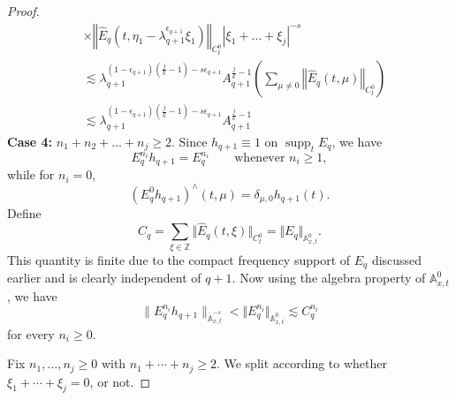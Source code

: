 \documentclass[12pt,reqno,letterpaper]{amsart}
\numberwithin{equation}{section}
\newcommand{\1}{{\bf 1}}
\newcommand{\2}{{\bf 2}}
\newcommand{\A}{\mathbb A}
\newcommand{\Z}{\mathbb Z}
\theoremstyle{remark}
\theoremstyle{remark}
\begin{document}
\begin{proof}
\begin{equation}
\begin{split}
           &\times \left\Vert \hat{E}_q(t,\eta_1 - \lambda_{q+1}^{\epsilon_{q+1}} \xi_1) \right\Vert_{C_t^0} |\xi_1 + \ldots + \xi_j|^{-s}\\
           &\lesssim \lambda_{q+1}^{(1-\epsilon_{q+1})\left(\frac{j}{k}-1\right) - s\epsilon_{q+1}} A_{q+1}^{\frac{j}{k}-1} \left(\sum_{\mu \not=0} \left\Vert \hat{E}_q(t,\mu) \right\Vert_{C_t^0}\right)\\
           &\lesssim \lambda_{q+1}^{(1-\epsilon_{q+1})\left(\frac{j}{k}-1\right) - s\epsilon_{q+1}} A_{q+1}^{\frac{j}{k}-1}
        \end{split}
    \end{equation}
    \textbf{Case 4:} $n_1 + n_2 + \ldots + n_j \geq 2$.
    Since $h_{q+1}\equiv 1$ on $\operatorname{supp}_t E_q$, we have
\[
    E_q^{n_i}h_{q+1}=E_q^{n_i}
    \qquad \text{whenever } n_i\geq 1,
\]
while for $n_i=0$,
\[
    \left(E_q^0h_{q+1}\right)^\wedge(t,\mu)
    =
    \delta_{\mu,0}h_{q+1}(t).
\]
Define
$$
C_q = \sum_{\xi \in \Z} \Vert \hat{E}_q(t,\xi) \Vert_{C_t^0} = \Vert E_q \Vert_{\A^0_{x,t}}.
$$
This quantity is finite due to the compact frequency support of $E_q$ discussed earlier and is clearly independent of $q+1$. Now using the algebra property of $\A^{0}_{x,t}$, we have
\[
    \|E_q^{n_i}h_{q+1}\|_{\dot{\mathbb{A}}_{x,t}^{-s}} < \Vert E_q^{n_i} \Vert_{\A^0_{x,t}}
    \lesssim C_q^{n_i}
\]
for every $n_i\geq0$.

Fix $n_1,\ldots,n_j\geq0$ with $n_1+\cdots+n_j\geq2$. We split according to whether $\xi_1+\cdots+\xi_j=0$, or not.


\end{proof}
\end{document}
